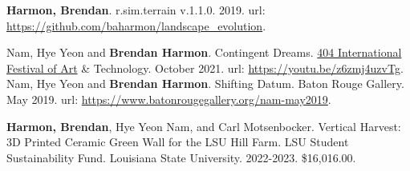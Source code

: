 \documentclass[10pt]{developercv} %
\begin{document}
\clearpage


\nocite{*}
\setlength\bibitemsep{0.75em}

\printbibliography[title={\cvsect{Books}}, type=book, heading=subbibliography]

\printbibliography[title={\cvsect{Papers}}, keyword=peer_reviewed, heading=subbibliography]

\printbibliography[title={\cvsect{Chapters}}, type=incollection, heading=subbibliography]

\printbibliography[title={\cvsect{Select presentations}}, type=unpublished, heading=subbibliography]

\printbibliography[title={\cvsect{Reports}}, type=report, heading=subbibliography]



\textbf{Harmon, Brendan}. r.sim.terrain v.1.1.0. 2019. url: \url{https://github.com/baharmon/landscape_evolution}.



Nam, Hye Yeon and \textbf{Brendan Harmon}. Contingent Dreams. \href{https://www.404festival.com}{404 International Festival of Art} \& Technology. October 2021. url: \url{https://youtu.be/z6zmj4uzvTg}.\\

Nam, Hye Yeon and \textbf{Brendan Harmon}. Shifting Datum. Baton Rouge Gallery. May 2019. 
url: \url{https://www.batonrougegallery.org/nam-may2019}.\\



\textbf{Harmon, Brendan}, Hye Yeon Nam, and Carl Motsenbocker.
Vertical Harvest: 3D Printed Ceramic Green Wall for the LSU Hill Farm.
LSU Student Sustainability Fund. Louisiana State University. 
2022-2023. \$16,016.00.\\
\end{document}
